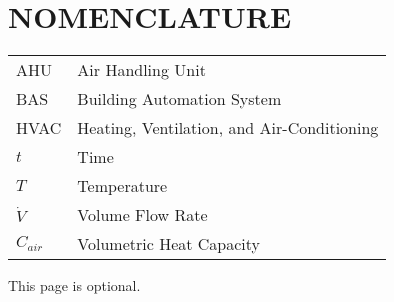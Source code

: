 %
%
%


\chapter*{NOMENCLATURE}

\begin{tabular}{ll}
AHU  & Air Handling Unit\tabularnewline
BAS & Building Automation System\tabularnewline
HVAC & Heating, Ventilation, and Air-Conditioning\tabularnewline
\(t\)  & Time\tabularnewline
\(T\) & Temperature\tabularnewline
\(\dot{V}\) & Volume Flow Rate \tabularnewline 
\(C_{air}\) & Volumetric Heat Capacity \tabularnewline
\end{tabular}


\vspace{2em}

This page is optional.

\pagebreak{}